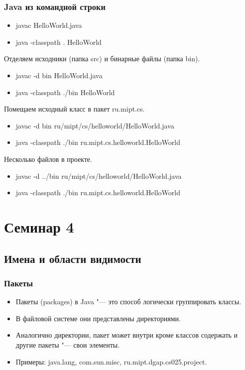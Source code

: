 \documentclass[default]{beamer}
\begin{document}
	\begin{frame}
		\frametitle{Java из командной строки}
		
		\begin{itemize}
			\item javac HelloWorld.java
			\item java -classpath . HelloWorld
		\end{itemize}
		
		Отделяем исходники (папка src) и бинарные файлы (папка bin).
		\begin{itemize}
			\item javac -d bin HelloWorld.java
			\item java -classpath ./bin HelloWorld
		\end{itemize}
		
		Помещаем исходный класс в пакет ru.mipt.cs.
		\begin{itemize}
			\item javac -d bin ru/mipt/cs/helloworld/HelloWorld.java
			\item java -classpath ./bin ru.mipt.cs.helloworld.HelloWorld
		\end{itemize}				
		
		Несколько файлов в проекте.		
		\begin{itemize}
			\item javac -d ../bin ru/mipt/cs/helloworld/HelloWorld.java
			\item java -classpath ./bin ru.mipt.cs.helloworld.HelloWorld
		\end{itemize}				
	\end{frame}

	\section{Семинар 4}
	\subsection{Имена и области видимости}
	\begin{frame}
		\frametitle{Пакеты}
		
		\begin{itemize}
			\item Пакеты (packages) в Java "--- это способ логически группировать классы.
			\item В файловой системе они представлены директориями.
			\item Аналогично директории, пакет может внутри кроме классов содержать и другие пакеты "--- свои элементы.
			\item Примеры: java.lang, com.sun.misc, ru.mipt.dgap.cs025.project.
		\end{itemize}
	\end{frame}
	
\end{document}
